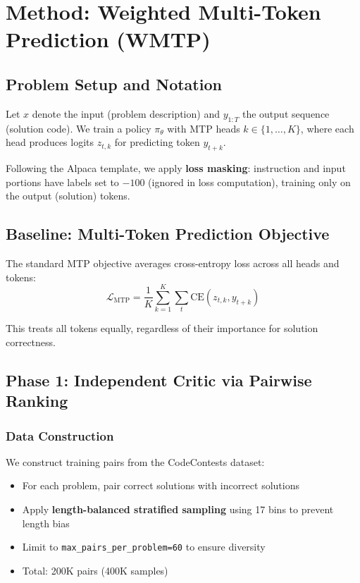 \section{Method: Weighted Multi-Token Prediction (WMTP)}

\subsection{Problem Setup and Notation}

Let $x$ denote the input (problem description) and $y_{1:T}$ the output sequence (solution code). We train a policy $\pi_\theta$ with MTP heads $k \in \{1, \ldots, K\}$, where each head produces logits $z_{t,k}$ for predicting token $y_{t+k}$.

Following the Alpaca template, we apply \textbf{loss masking}: instruction and input portions have labels set to $-100$ (ignored in loss computation), training only on the output (solution) tokens.

\subsection{Baseline: Multi-Token Prediction Objective}

The standard MTP objective averages cross-entropy loss across all heads and tokens:
\begin{equation}
    \mathcal{L}_{\text{MTP}} = \frac{1}{K} \sum_{k=1}^{K} \sum_t \text{CE}(z_{t,k}, y_{t+k})
    \label{eq:mtp_baseline}
\end{equation}

This treats all tokens equally, regardless of their importance for solution correctness.

\subsection{Phase 1: Independent Critic via Pairwise Ranking}

\subsubsection{Data Construction}

We construct training pairs from the CodeContests dataset:
\begin{itemize}[nosep]
    \item For each problem, pair correct solutions with incorrect solutions
    \item Apply \textbf{length-balanced stratified sampling} using 17 bins to prevent length bias
    \item Limit to \texttt{max\_pairs\_per\_problem=60} to ensure diversity
    \item Total: 200K pairs (400K samples)
\end{itemize}

